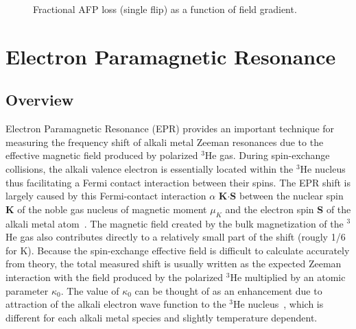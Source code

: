 \begin{figure}[H]
	\centering
	\caption{{ Fractional AFP loss (single flip) as a function of field gradient.}}
	\label{AFPLossvsGradient}
\end{figure}

\section{Electron Paramagnetic Resonance}

\subsection{Overview}

Electron Paramagnetic Resonance (EPR) provides an important technique for measuring the frequency shift of alkali metal Zeeman resonances due to the effective magnetic field produced by polarized $^{3}$He gas. During spin-exchange collisions, the alkali valence electron is essentially located within the $^3$He nucleus thus facilitating a Fermi contact interaction between their spins. The EPR shift is largely caused by this Fermi-contact interaction $\alpha$ {\bf K$\cdot$S} between the nuclear spin {\bf K} of the noble gas nucleus of magnetic moment $\mu_{K}$ and the electron spin {\bf S} of the alkali metal atom~\cite{PhysRevA.71.013414}. The magnetic field created by the bulk magnetization of the $^{3}$He gas also contributes directly to a relatively small part of the shift (rougly 1/6 for K). Because the spin-exchange effective field is difficult to calculate accurately from theory, the total measured shift is usually written as the expected Zeeman interaction with the field produced by the polarized $^{3}$He multiplied by an atomic parameter $\kappa_{0}$. The value of $\kappa_0$ can be thought of as an enhancement due to attraction of the alkali electron wave function to the $^3$He nucleus~\cite{PhysRevA.58.3004}, which is different for each alkali metal species and slightly temperature dependent.

